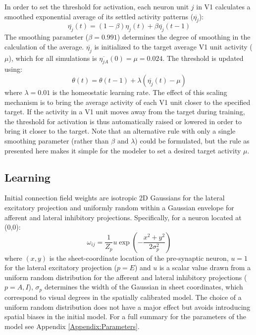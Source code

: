 In order to set the threshold for activation, each neuron unit $j$ in
V1 calculates a smoothed exponential average of its settled activity
patterns ($\overline{\eta_{j}}$):
\begin{equation}
\overline{\eta_{j}}(t)= (1-\beta)\eta_{j}(t) + \beta\overline{\eta_{j}}(t-1)
\label{eqn:averaging}
\end{equation}
The smoothing parameter ($\beta=0.991$) determines the degree of
smoothing in the calculation of the average. $\overline{\eta_{j}}$ is
initialized to the target average V1 unit activity ($\mu$), which for
all simulations is $\overline{\eta_{jA}}(0) = \mu= 0.024$. The
threshold is updated using:
\begin{equation}
\label{eqn:thresholdupdate}%
\theta(t)= \theta(t-1) + \lambda(\overline{\eta_{j}}(t) -\mu)
\end{equation}
where $\lambda=0.01$ is the homeostatic learning rate. The effect of
this scaling mechanism is to bring the average activity of each V1
unit closer to the specified target. If the activity in a V1 unit
moves away from the target during training, the threshold for
activation is thus automatically raised or lowered in order to bring
it closer to the target. Note that an alternative rule with only a
single smoothing parameter (rather than $\beta$ and $\lambda$) could
be formulated, but the rule as presented here makes it simple for the
modeler to set a desired target activity $\mu$.

\subsection*{Learning}

Initial connection field weights are isotropic 2D Gaussians for the
lateral excitatory projection and uniformly random within a Gaussian
envelope for afferent and lateral inhibitory
projections. Specifically, for a neuron located at (0,0):
\begin{equation}
\omega_{ij}=\frac{1}{Z_p}u\exp\left(-\frac{x^{2}+y^{2}}{2\sigma_{p}^{2}}\right)
\label{eqn:gaussrandomweights}
\end{equation}
where $(x, y)$ is the sheet-coordinate location of the pre-synaptic
neuron, $u=1$ for the lateral excitatory projection ($p=E$) and $u$ is
a scalar value drawn from a uniform random distribution for the
afferent and lateral inhibitory projections ($p=A,I$), $\sigma_{p}$
determines the width of the Gaussian in sheet coordinates, which
correspond to visual degrees in the spatially calibrated model. The
choice of a uniform random distribution does not have a major effect
but avoids introducing spatial biases in the initial model. For a full
summary for the parameters of the model see Appendix
\ref{Appendix:Parameters}.

